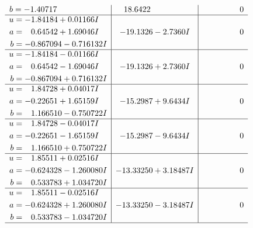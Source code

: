 \documentclass[1p]{elsarticle_modified}
\theoremstyle{definition}
\begin{document}
$$\begin{array}{c|c|c}
\begin{aligned}
b &= -1.40717\phantom{ +0.000000I}\end{aligned}
 & \phantom{-}18.6422\phantom{ +0.000000I} & \phantom{-0.000000 } 0 \\ \hline\begin{aligned}
u &= -1.84184 + 0.01166 I \\
a &= \phantom{-}0.64542 + 1.69046 I \\
b &= -0.867094 - 0.716132 I\end{aligned}
 & -19.1326 - 2.7360 I & \phantom{-0.000000 } 0 \\ \hline\begin{aligned}
u &= -1.84184 - 0.01166 I \\
a &= \phantom{-}0.64542 - 1.69046 I \\
b &= -0.867094 + 0.716132 I\end{aligned}
 & -19.1326 + 2.7360 I & \phantom{-0.000000 } 0 \\ \hline\begin{aligned}
u &= \phantom{-}1.84728 + 0.04017 I \\
a &= -0.22651 + 1.65159 I \\
b &= \phantom{-}1.166510 - 0.750722 I\end{aligned}
 & -15.2987 + 9.6434 I & \phantom{-0.000000 } 0 \\ \hline\begin{aligned}
u &= \phantom{-}1.84728 - 0.04017 I \\
a &= -0.22651 - 1.65159 I \\
b &= \phantom{-}1.166510 + 0.750722 I\end{aligned}
 & -15.2987 - 9.6434 I & \phantom{-0.000000 } 0 \\ \hline\begin{aligned}
u &= \phantom{-}1.85511 + 0.02516 I \\
a &= -0.624328 - 1.260080 I \\
b &= \phantom{-}0.533783 + 1.034720 I\end{aligned}
 & -13.33250 + 3.18487 I & \phantom{-0.000000 } 0 \\ \hline\begin{aligned}
u &= \phantom{-}1.85511 - 0.02516 I \\
a &= -0.624328 + 1.260080 I \\
b &= \phantom{-}0.533783 - 1.034720 I\end{aligned}
 & -13.33250 - 3.18487 I & \phantom{-0.000000 } 0\\
 \hline 
 \end{array}$$\newpage\newpage\renewcommand{\arraystretch}{1}
\end{document}
